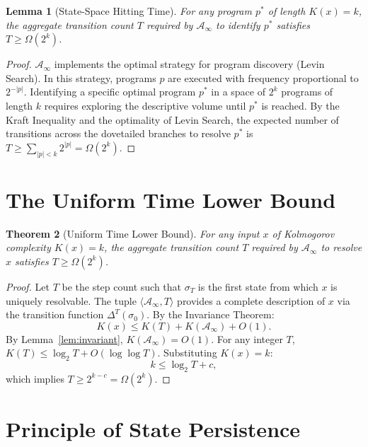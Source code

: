 \documentclass[12pt,a4paper]{article}
\theoremstyle{plain}
\newtheorem{theorem}{Theorem}[section]
\newtheorem{lemma}[theorem]{Lemma}
\theoremstyle{definition}
\begin{document}
\begin{lemma}[State-Space Hitting Time] \label{lem:ergodic}
For any program $p^*$ of length $K(x)=k$, the aggregate transition count $T$ required by 
$\mathcal{A}_\infty$ to identify $p^*$ satisfies $T \ge \Omega(2^k)$.
\end{lemma}
\begin{proof}
$\mathcal{A}_\infty$ implements the optimal strategy for program discovery (Levin Search). 
In this strategy, programs $p$ are executed with frequency proportional to $2^{-|p|}$. 
Identifying a specific optimal program $p^*$ in a space of $2^k$ programs of length $k$ 
requires exploring the descriptive volume until $p^*$ is reached. By the Kraft Inequality 
and the optimality of Levin Search, the expected number of transitions across the dovetailed 
branches to resolve $p^*$ is $T \ge \sum_{|p|<k} 2^{|p|} = \Omega(2^k)$.
\end{proof}

\section{The Uniform Time Lower Bound} \label{sec:proof}

\begin{theorem}[Uniform Time Lower Bound] \label{thm:lower_bound}
For any input $x$ of Kolmogorov complexity $K(x) = k$, the aggregate transition count $T$ 
required by $\mathcal{A}_\infty$ to resolve $x$ satisfies $T \ge \Omega(2^k)$.
\end{theorem}
\begin{proof}
Let $T$ be the step count such that $\sigma_T$ is the first state from which $x$ is uniquely 
resolvable. The tuple $\langle \mathcal{A}_\infty, T \rangle$ provides a complete description 
of $x$ via the transition function $\Delta^T(\sigma_0)$. By the Invariance Theorem:
\begin{equation}
    K(x) \le K(T) + K(\mathcal{A}_\infty) + O(1).
\end{equation}
By Lemma~\ref{lem:invariant}, $K(\mathcal{A}_\infty) = O(1)$. For any integer $T$, $K(T) \le 
\log_2 T + O(\log \log T)$. Substituting $K(x) = k$:
\begin{equation}
    k \le \log_2 T + c,
\end{equation}
which implies $T \ge 2^{k-c} = \Omega(2^k)$. 
\end{proof}

\section{Principle of State Persistence} \label{sec:persistence}
\end{document}
